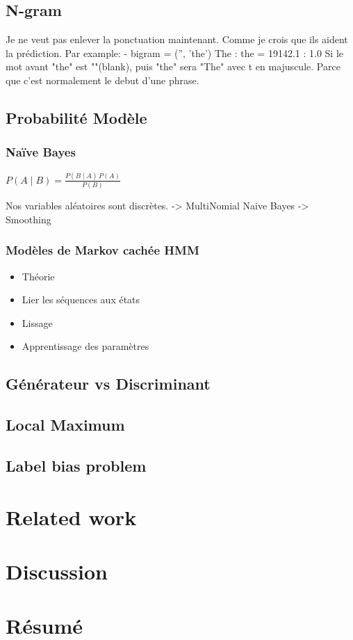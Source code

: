 \documentclass[a4paper]{article}
\begin{document}
\subsection{N-gram}
Je ne veut pas enlever la ponctuation maintenant. Comme je crois que ils aident la prédiction.  Par example:
- bigram = ('', 'the')       The : the    =  19142.1 : 1.0
Si le mot avant "the" est ""(blank), puis "the" sera "The" avec t en majuscule. Parce que c'est normalement le debut d'une phrase.

\subsection{Probabilité Modèle}
\subsubsection{Naïve Bayes}
$ P(A \mid B) = \frac{P(B \mid A) \, P(A)}{P(B)} $

{ Nos variables aléatoires sont discrètes. -> MultiNomial Naive Bayes -> Smoothing}

\subsubsection{Modèles de Markov cachée HMM}
\begin{itemize}
\item Théorie
\item Lier les séquences aux états
\item Lissage
\item Apprentissage des paramètres
\end{itemize}


\subsection{Générateur vs Discriminant}

\subsection{Local Maximum}

\subsection{Label bias problem}

\section{Related work}
\section{Discussion}
\section{Résumé}
\cite{greenwade93}




\end{document}
